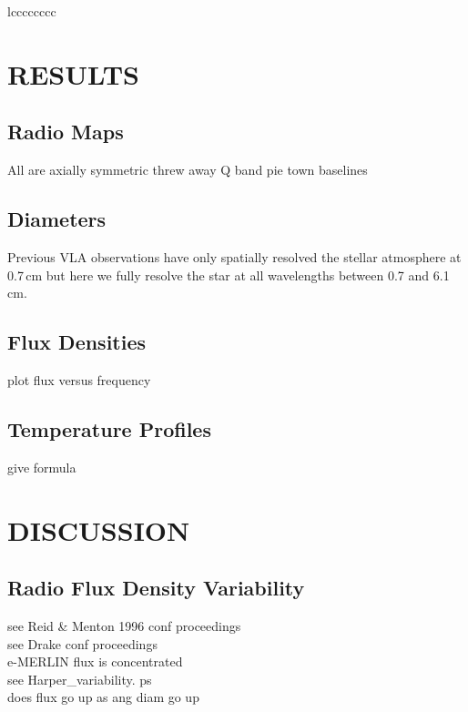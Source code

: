 \documentclass[iop]{emulateapj}
\begin{document}
\begin{deluxetable*}{lcccccccc}
\enddata
{}
\label{tab1}
\end{deluxetable*}

\section{RESULTS} 
\subsection{Radio Maps} 
All are axially symmetric
threw away Q band pie town baselines
\subsection{Diameters} 
Previous VLA observations have only spatially resolved the stellar atmosphere at 0.7\,cm but here we fully resolve the star at all wavelengths between 0.7 and 6.1\,cm.
\subsection{Flux Densities}
plot flux versus frequency
\subsection{Temperature Profiles}
give formula 

\section{DISCUSSION}
\subsection{Radio Flux Density Variability} 
see Reid \& Menton 1996 conf proceedings\\
see Drake conf proceedings\\
e-MERLIN flux is concentrated\\
see Harper\_variability. ps\\
does flux go up as ang diam go up
\end{document}
